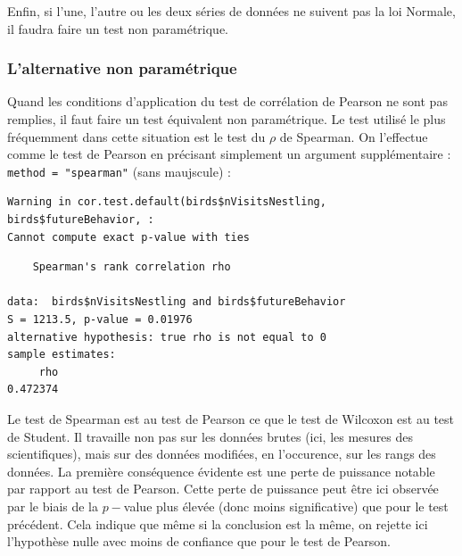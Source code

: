 \documentclass[
  a4paper,
]{article}
\newenvironment{Shaded}{\begin{snugshade}}{\end{snugshade}}
\newcommand{\AttributeTok}[1]{\textcolor[rgb]{0.00,0.34,0.68}{#1}}
\newcommand{\FunctionTok}[1]{\textcolor[rgb]{0.39,0.29,0.61}{#1}}
\newcommand{\NormalTok}[1]{\textcolor[rgb]{0.12,0.11,0.11}{#1}}
\newcommand{\SpecialCharTok}[1]{\textcolor[rgb]{0.24,0.68,0.91}{#1}}
\newcommand{\StringTok}[1]{\textcolor[rgb]{0.75,0.01,0.01}{#1}}
\begin{document}
Enfin, si l'une, l'autre ou les deux séries de données ne suivent pas la loi Normale, il faudra faire un test non paramétrique.

\hypertarget{lalternative-non-paramuxe9trique-4}{%
\subsubsection{L'alternative non paramétrique}\label{lalternative-non-paramuxe9trique-4}}

Quand les conditions d'application du test de corrélation de Pearson ne sont pas remplies, il faut faire un test équivalent non paramétrique. Le test utilisé le plus fréquemment dans cette situation est le test du \(\rho\) de Spearman. On l'effectue comme le test de Pearson en précisant simplement un argument supplémentaire : \texttt{method\ =\ "spearman"} (sans maujscule) :

\begin{Shaded}
\end{Shaded}

\begin{verbatim}
Warning in cor.test.default(birds$nVisitsNestling, birds$futureBehavior, :
Cannot compute exact p-value with ties
\end{verbatim}

\begin{verbatim}
    Spearman's rank correlation rho

data:  birds$nVisitsNestling and birds$futureBehavior
S = 1213.5, p-value = 0.01976
alternative hypothesis: true rho is not equal to 0
sample estimates:
     rho 
0.472374 
\end{verbatim}

Le test de Spearman est au test de Pearson ce que le test de Wilcoxon est au test de Student. Il travaille non pas sur les données brutes (ici, les mesures des scientifiques), mais sur des données modifiées, en l'occurence, sur les rangs des données. La première conséquence évidente est une perte de puissance notable par rapport au test de Pearson. Cette perte de puissance peut être ici observée par le biais de la \(p-\)value plus élevée (donc moins significative) que pour le test précédent. Cela indique que même si la conclusion est la même, on rejette ici l'hypothèse nulle avec moins de confiance que pour le test de Pearson.
\end{document}
